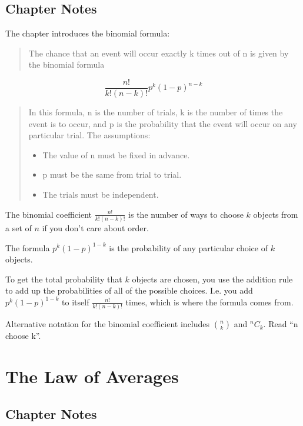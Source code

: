 \documentclass[
]{book}
\providecommand{\tightlist}{%
  \setlength{\itemsep}{0pt}\setlength{\parskip}{0pt}}
\begin{document}
\hypertarget{chapter-notes-14}{%
\section{Chapter Notes}\label{chapter-notes-14}}

The chapter introduces the binomial formula:

\begin{quote}
The chance that an event will occur exactly k times out of n is given by the binomial formula
\end{quote}

\[
\frac{n!}{k!(n-k)!} p^k (1-p)^{n-k}
\]

\begin{quote}
In this formula, n is the number of trials, k is the number of times the event is to occur, and p is the probability that the event will occur on any particular trial. The assumptions:

\begin{itemize}
\tightlist
\item
  The value of n must be fixed in advance.
\item
  p must be the same from trial to trial.
\item
  The trials must be independent.
\end{itemize}
\end{quote}

The binomial coefficient \(\frac{n!}{k!(n-k)!}\) is the number of ways to choose \(k\) objects from a set of \(n\) if you don't care about order.

The formula \(p^k(1-p)^{1-k}\) is the probability of any particular choice of \(k\) objects.

To get the total probability that \(k\) objects are chosen, you use the addition rule to add up the probabilities of all of the possible choices. I.e. you add \(p^k(1-p)^{1-k}\) to itself \(\frac{n!}{k!(n-k)!}\) times, which is where the formula comes from.

Alternative notation for the binomial coefficient includes \(n \choose k\) and \(^nC_k\). Read ``n choose k''.

\hypertarget{law_averages}{%
\chapter{The Law of Averages}\label{law_averages}}

\hypertarget{chapter-notes-15}{%
\section{Chapter Notes}\label{chapter-notes-15}}
\end{document}
